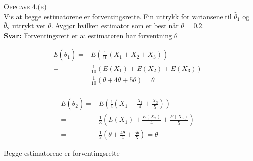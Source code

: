 \documentclass{article}
\begin{document}
\textsc{Oppgave 4.(b)}\\
Vis at begge estimatorene er forventingsrette. Fin uttrykk for variansene til
$\hat{\theta}_1$ og $\hat{\theta}_2$ uttrykt vet $\theta.$ Avgjør hvilken
estimator som er best når $\theta=0.2.$\\
\textbf{Svar:} Forventingsrett er at estimatoren har forventning $\theta$\\
\begin{minipage}[t]{.5\linewidth}
  \begin{align*}
    E(\hat{\theta}_1)=&E\left(\frac{1}{10}(X_1+X_2+X_3)\right)\\
    =&\frac{1}{10}(E(X_1)+E(X_2)+E(X_3))\\
    =&\frac{1}{10}(\theta+4\theta+5\theta)=\theta\\
  \end{align*} 
\end{minipage}
\begin{minipage}[t]{.5\linewidth}
  \begin{align*}
    E(\hat{\theta}_2)=&E\left(\frac{1}{3}\left(X_1+ \frac{X_2}{4}+\frac{X_3}{5}\right)\right)\\
    =&\frac{1}{3}\left(E(X_1)+\frac{E(X_2)}{4}+\frac{E(X_3)}{5}\right)\\
    =&\frac{1}{3}\left( \theta + \frac{4\theta}{4}+\frac{5\theta}{5} \right)=\theta
  \end{align*}
\end{minipage}
Begge estimatorene er forventingsrette\\
\end{document}
